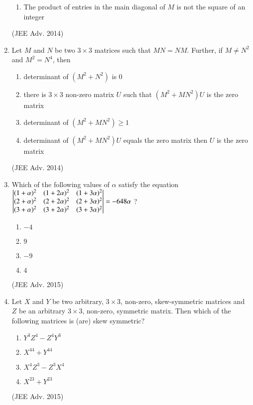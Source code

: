 \documentclass[journal,12pt,twocolumn]{IEEEtran}
\theoremstyle{remark}
\begin{document}
\begin{enumerate}
\begin{enumerate}
							\item The product of entries in the main diagonal of $M$ is not the square of an integer
						\end{enumerate}
						\hfill (JEE Adv. 2014)\\
				\item
					Let $M$ and $N$ be two $3 \times 3$ matrices such that $MN=NM$. Further, if $M \neq N^2$ and $M^2 = N^4$, then
						\begin{enumerate}
							\item determinant of $(M^2 + N^2)$ is $0$
							\item there is $3 \times 3$ non-zero matrix $U$ such that $(M^2+MN^2)U$ is the zero matrix
							\item determinant of $(M^2 + MN^2) \geq 1$
							\item determinant of $(M^2 + MN^2)U$ equals the zero matrix then $U$ is the zero matrix
						\end{enumerate}
						\hfill (JEE Adv. 2014)\\
				\item
					Which of the following values of $\alpha$ satisfy the equation
						$\begin{vmatrix}
							(1 + \alpha)^2 & (1 + 2\alpha)^2 & (1+3\alpha)^2\\
							(2 + \alpha)^2 & (2 + 2\alpha)^2 & (2+3\alpha)^2\\
							(3 + \alpha)^2 & (3 + 2\alpha)^2 & (3+3\alpha)^2
						\end{vmatrix} = -648 \alpha $ ?
							\begin{enumerate}
								\item $-4$
								\item $9$
								\item $-9$
								\item $4$
							\end{enumerate}
							\hfill (JEE Adv. 2015)\\
				\item
					Let $X$ and $Y$ be two arbitrary, $3 \times 3$, non-zero, skew-symmetric matrices and $Z$ be an arbitrary $3 \times 3$, non-zero, symmetric matrix. Then which of the following matrices is (are) skew symmetric?
					\begin{enumerate}
						\item $Y^3Z^4 -Z^4Y^3$
						\item $X^{44} + Y^{44}$
						\item $X^4Z^3 -Z^3X^4$
						\item $X^{23} + Y^{23}$
					\end{enumerate}
					\hfill (JEE Adv. 2015)\\

\end{enumerate}
\end{document}
